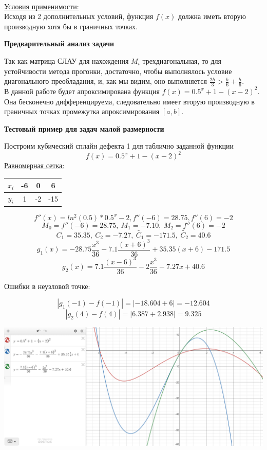 \documentclass{article}
\begin{document}
	\\
	\underline{Условия применимости:}\\
	Исходя из 2 дополнительных условий, функция $f(x)$ должна иметь вторую производную хотя бы в граничных точках.
	\begin{center} \textbf{Предварительный анализ задачи}\end{center}
	Так как матрица СЛАУ для нахождения $M_i$ трехдиагональная, то для устойчивости метода прогонки, достаточно, чтобы выполнялось условие диагонального преобладания, и, как мы видим, оно выполняется $\frac{2h}{3} > \frac{h}{6} + \frac{h}{6}$.\\
	В данной работе будет апроксимирована функция $f(x) = 0.5^x + 1 - (x-2)^2$. Она бесконечно дифференцируема, следовательно имеет вторую производную в граничных  точках промежутка апроксимирования $[a,b]$.
	\begin{center} \textbf{Тестовый пример для задач малой размерности}\end{center}
	Построим кубический сплайн дефекта 1 для таблично заданной функции
	$$f(x) = 0.5^x + 1 - (x - 2)^2$$
	\underline{Равномерная сетка:}
	\begin{center}
		\begin{tabular}{|c|c|c|c|}
			\hline
			$x_i$ & -6 & 0 & 6 \\ \hline
			$y_i$ & 1 & -2 & -15 \\ 
			\hline
		\end{tabular}
	\end{center}
	$$f''(x) = ln^2(0.5) * 0.5^x - 2, f''(-6) = 28.75, f''(6) = -2$$
	$$M_0 = f''(-6) = 28.75,\ M_1 = -7.10,\ M_2 = f''(6) = -2$$
	$$C_1 = 35.35,\ C_2 = -7.27,\ \tilde{C_1} = -171.5,\ \tilde{C_2} = 40.6$$
	$$g_1(x) = -28.75\frac{x^3}{36} - 7.1\frac{(x+6)^3}{36} + 35.35(x+6) - 171.5$$ $$g_2(x) = 7.1\frac{(x - 6)^3}{36} - 2\frac{x^3}{36} - 7.27x + 40.6$$
	\begin{center}Ошибки в неузловой точке:\end{center}
		$$|g_1(-1) - f(-1)| = |-18.604 + 6| = -12.604$$
		$$|g_2(4) - f(4)| = |6.387 + 2.938| = 9.325$$
	\begin{center} \includegraphics[scale = 0.4]{Тестовый пример}\end{center}
\end{document}
